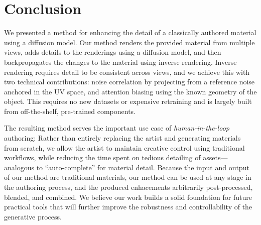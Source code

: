 \section{Conclusion}
\label{sec:conclusion}

We presented a method for enhancing the detail of a classically authored material using a diffusion model.
Our method renders the provided material from multiple views, adds details to the renderings using a diffusion model, and then backpropagates the changes to the material using inverse rendering.
Inverse rendering requires detail to be consistent across views, and we achieve this with two technical contributions: noise correlation by projecting from a reference noise anchored in the UV space, and attention biasing using the known geometry of the object.
This requires no new datasets or expensive retraining and is largely built from off-the-shelf, pre-trained components.

The resulting method serves the important use case of \emph{human-in-the-loop} authoring: Rather than entirely replacing the artist and generating materials from scratch, we allow the artist to maintain creative control using traditional workflows, while reducing the time spent on tedious detailing of assets---analogous to ``auto-complete'' for material detail. Because the input and output of our method are traditional materials, our method can be used at any stage in the authoring process, and the produced enhacements arbitrarily post-processed, blended, and combined. We believe our work builds a solid foundation for future practical tools that will further improve the robustness and controllability of the generative process.






